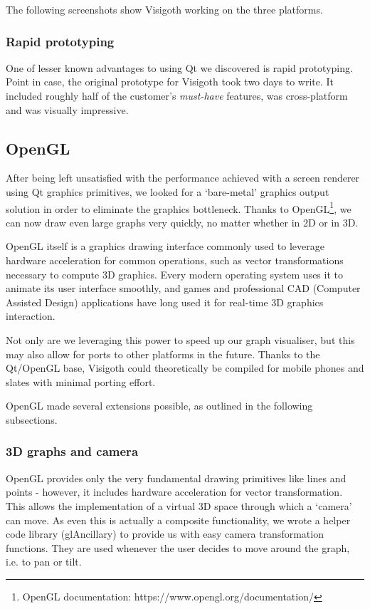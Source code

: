 \documentclass[a4paper,11pt,titlepage]{article}
\begin{document}
The following screenshots show Visigoth working on the three
platforms.

\subsubsection{Rapid prototyping}

One of lesser known advantages to using Qt we discovered is rapid
prototyping. Point in case, the original prototype for Visigoth took
two days to write. It included roughly half of the customer's
\emph{must-have} features, was cross-platform and was visually
impressive.

\subsection{OpenGL}
\label{opengl}

After being left unsatisfied with the performance achieved with a
screen renderer using Qt graphics primitives, we looked for a `bare-metal'
graphics output solution in order to eliminate the graphics bottleneck.
Thanks to OpenGL\footnote{OpenGL documentation:
https://www.opengl.org/documentation/},
we can now draw even large graphs very quickly,
no matter whether in 2D or in 3D.

OpenGL itself is a graphics drawing interface commonly used to
leverage hardware acceleration for common operations, such as vector
transformations necessary to compute 3D graphics. Every modern
operating system uses it to animate its user interface smoothly,
and games and professional CAD (Computer Assisted Design) applications
have long used it for real-time 3D graphics interaction.

Not only are we leveraging this power to speed up our graph
visualiser, but this may also allow for ports to other
platforms in the future. Thanks to the Qt/OpenGL base, Visigoth
could theoretically be compiled for mobile phones and slates
with minimal porting effort.

OpenGL made several extensions possible, as outlined in the following
subsections.

\subsubsection{3D graphs and camera}
OpenGL provides only the very fundamental drawing primitives like
lines and points - however, it includes hardware acceleration for
vector transformation. This allows the implementation of a virtual
3D space through which a `camera' can move. As even this is actually
a composite functionality, we wrote a helper code library (glAncillary)
to provide us with easy camera transformation functions. They are
used whenever the user decides to move around the graph, i.e. to
pan or tilt.
\end{document}
